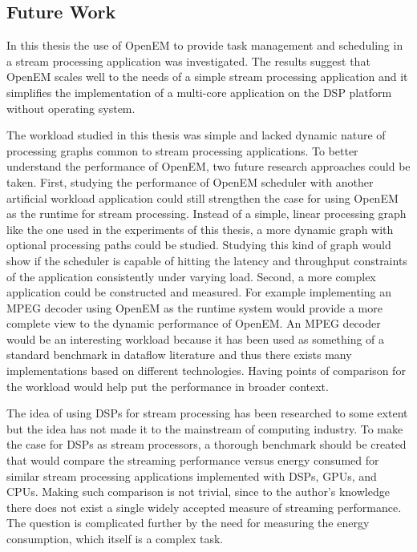 \subsection{Future Work}
\label{subsec:future-work}
In this thesis the use of OpenEM to provide task management and scheduling in a stream processing application was investigated. The results suggest that OpenEM scales well to the needs of a simple stream processing application and it simplifies the implementation of a multi-core application on the DSP platform without operating system.

The workload studied in this thesis was simple and lacked dynamic nature of processing graphs common to stream processing applications. To better understand the performance of OpenEM, two future research approaches could be taken. First, studying the performance of OpenEM scheduler with another artificial workload application could still strengthen the case for using OpenEM as the runtime for stream processing. Instead of a simple, linear processing graph like the one used in the experiments of this thesis, a more dynamic graph with optional processing paths could be studied. Studying this kind of graph would show if the scheduler is capable of hitting the latency and throughput constraints of the application consistently under varying load. Second, a more complex application could be constructed and measured. For example implementing an MPEG decoder using OpenEM as the runtime system would provide a more complete view to the dynamic performance of OpenEM. An MPEG decoder would be an interesting workload because it has been used as something of a standard benchmark in dataflow literature and thus there exists many implementations based on different technologies. Having points of comparison for the workload would help put the performance in broader context.

The idea of using DSPs for stream processing has been researched to some extent but the idea has not made it to the mainstream of computing industry. To make the case for DSPs as stream processors, a thorough benchmark should be created that would compare the streaming performance versus energy consumed for similar stream processing applications implemented with DSPs, GPUs, and CPUs. Making such comparison is not trivial, since to the author's knowledge there does not exist a single widely accepted measure of streaming performance. The question is complicated further by the need for measuring the energy consumption, which itself is a complex task.

